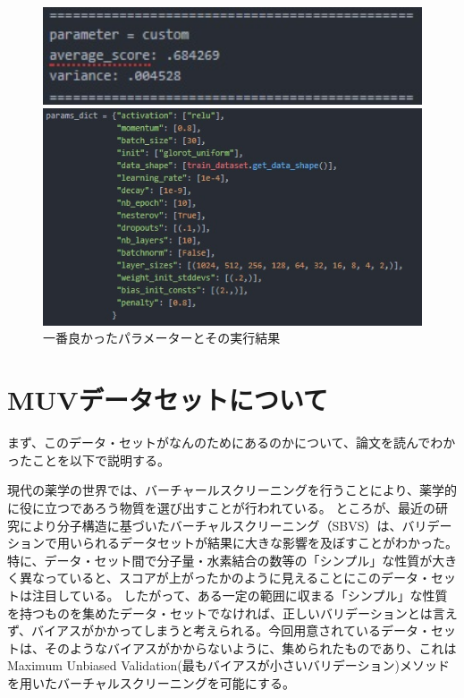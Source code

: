 \documentclass[a4j,11pt]{jarticle}
\begin{document}
\begin{figure}
	\begin{minipage}{0.50\hsize}
		\begin{center}
			\includegraphics[width=12cm, bb=0 0 296 76]{optimal2.jpg}
		\end{center}
	\end{minipage}
	\begin{minipage}{0.50\hsize}
		\begin{center}
			\includegraphics[width=12cm, bb=0 0 488 279]{optimal2p.jpg}
		\end{center}
	\end{minipage}
	\caption{一番良かったパラメーターとその実行結果}
	\label{optimal2}
\end{figure}

\clearpage

\section{MUVデータセットについて}

まず、このデータ・セットがなんのためにあるのかについて、論文\cite{thesis}を読んでわかったことを以下で説明する。


現代の薬学の世界では、バーチャールスクリーニングを行うことにより、薬学的に役に立つであろう物質を選び出すことが行われている。
ところが、最近の研究により分子構造に基づいたバーチャルスクリーニング（SBVS）は、バリデーションで用いられるデータセットが結果に大きな影響を及ぼすことがわかった。特に、データ・セット間で分子量・水素結合の数等の「シンプル」な性質が大きく異なっていると、スコアが上がったかのように見えることにこのデータ・セットは注目している。
したがって、ある一定の範囲に収まる「シンプル」な性質を持つものを集めたデータ・セットでなければ、正しいバリデーションとは言えず、バイアスがかかってしまうと考えられる。今回用意されているデータ・セットは、そのようなバイアスがかからないように、集められたものであり、これはMaximum Unbiased Validation(最もバイアスが小さいバリデーション)メソッドを用いたバーチャルスクリーニングを可能にする。
\end{document}
